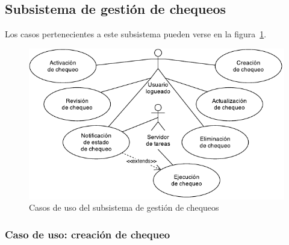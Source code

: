 \subsection{Subsistema de gestión de chequeos}

Los casos pertenecientes a este subsistema pueden verse en la figura~\ref{fig:subsistema-chequeos}.

\begin{figure}[htbp]
  \centering
  \includegraphics[width=\textwidth]{4_analisis/diagrama_subsistema_gestion_chequeos}
  \caption{Casos de uso del subsistema de gestión de chequeos}
  \label{fig:subsistema-chequeos}
\end{figure}

\subsubsection{Caso de uso: creación de chequeo}

